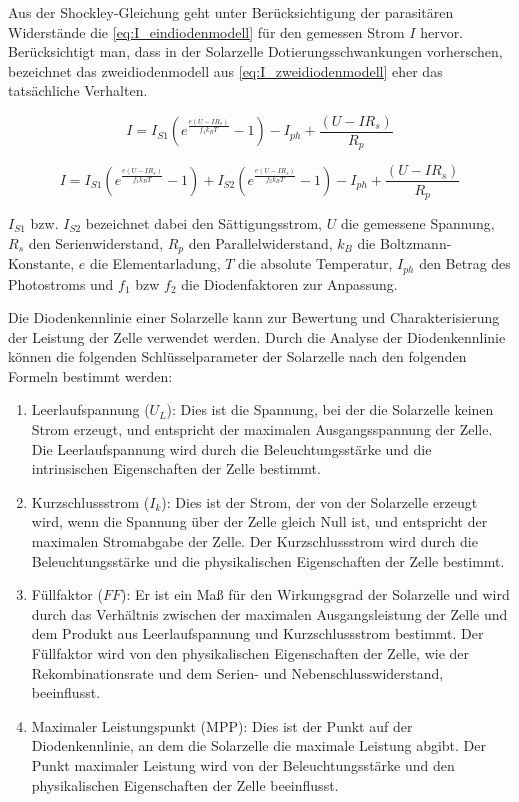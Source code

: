 \documentclass[12pt,english,ngerman]{scrartcl}
\begin{document}
Aus der Shockley-Gleichung geht unter Berücksichtigung der parasitären
Widerstände die \autoref{eq:I_eindiodenmodell} für den gemessen Strom $I$
hervor. Berücksichtigt man, dass in der Solarzelle Dotierungsschwankungen
vorherschen, bezeichnet das zweidiodenmodell aus
\autoref{eq:I_zweidiodenmodell} eher das tatsächliche Verhalten.

\begin{equation}
	I=I_{S 1}\left(e^{\frac{e\left(U-I R_s\right)}{f_1 k_B T}}-1\right)-I_{p h}+\frac{\left(U-I R_s\right)}{R_p}
	\label{eq:I_eindiodenmodell}
\end{equation}

\begin{equation}
	I=I_{S 1}\left(e^{\frac{e\left(U-I R_s\right)}{f_1 k_B T}}-1\right)+I_{S 2}\left(e^{\frac{e\left(U-I R_s\right)}{f_2 k_B T}}-1\right)-I_{p h}+\frac{\left(U-I R_s\right)}{R_p}
	\label{eq:I_zweidiodenmodell}
\end{equation}

$I_{S 1}$ bzw. $I_{S 2}$ bezeichnet dabei den Sättigungsstrom,
$U$ die gemessene Spannung,
$R_{s}$ den Serienwiderstand,
$R_p$ den Parallelwiderstand,
$k_B$ die Boltzmann-Konstante,
$e$ die Elementarladung,
$T$ die absolute Temperatur,
$I_{ph}$ den Betrag des Photostroms und
$f_1$ bzw $f_2$ die Diodenfaktoren zur Anpassung.

Die Diodenkennlinie einer Solarzelle kann zur Bewertung und Charakterisierung
der Leistung der Zelle verwendet werden. Durch die Analyse der Diodenkennlinie
können die folgenden Schlüsselparameter der Solarzelle nach den folgenden
Formeln bestimmt werden:

\begin{enumerate}
	\item Leerlaufspannung ($U_L$): Dies ist die Spannung, bei der die Solarzelle keinen
	      Strom erzeugt, und entspricht der maximalen Ausgangsspannung der Zelle. Die
	      Leerlaufspannung wird durch die Beleuchtungsstärke und die intrinsischen
	      Eigenschaften der Zelle bestimmt.
	\item Kurzschlussstrom ($I_k$): Dies ist der Strom, der von der Solarzelle erzeugt
	      wird, wenn die Spannung über der Zelle gleich Null ist, und entspricht der
	      maximalen Stromabgabe der Zelle. Der Kurzschlussstrom wird durch die
	      Beleuchtungsstärke und die physikalischen Eigenschaften der Zelle bestimmt.
	\item Füllfaktor ($FF$): Er ist ein Maß für den Wirkungsgrad der Solarzelle und wird
	      durch das Verhältnis zwischen der maximalen Ausgangsleistung der Zelle und dem
	      Produkt aus Leerlaufspannung und Kurzschlussstrom bestimmt. Der Füllfaktor wird
	      von den physikalischen Eigenschaften der Zelle, wie der Rekombinationsrate und
	      dem Serien- und Nebenschlusswiderstand, beeinflusst.
	\item Maximaler Leistungspunkt (MPP): Dies ist der Punkt auf der Diodenkennlinie, an
	      dem die Solarzelle die maximale Leistung abgibt. Der Punkt maximaler Leistung
	      wird von der Beleuchtungsstärke und den physikalischen Eigenschaften der Zelle
	      beeinflusst.
\end{enumerate}
\end{document}
